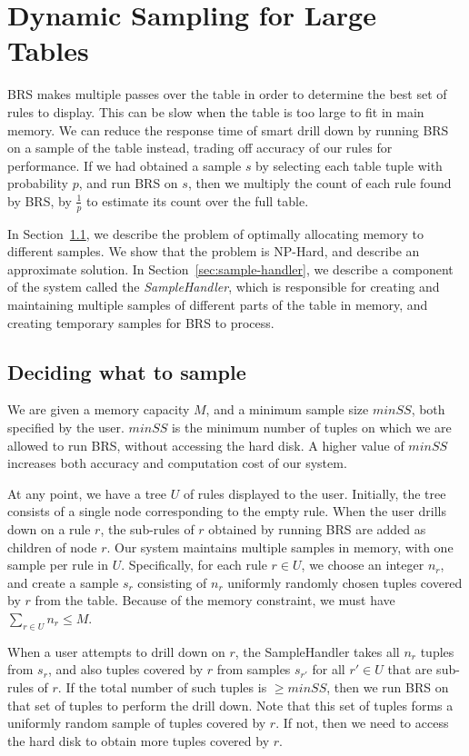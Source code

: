 \documentclass[10pt,journal,compsoc]{IEEEtran}
\newcounter{prob}
\newcommand{\papertext}[1]{#1}
\begin{document}
\section{Dynamic Sampling for Large Tables}\label{sec:sampling}

\papertext{
BRS makes multiple passes over the table in order to determine the best set of rules to display. This can be slow when the table is too large to fit in main memory. We can reduce the response time of smart drill down by running BRS on a sample of the table instead, trading off accuracy of our rules for performance. If we had obtained a sample $s$ by selecting each table tuple with probability $p$, and run BRS on $s$, then we multiply the count of each rule found by BRS, by $\frac{1}{p}$ to estimate its count over the full table.

In Section~\ref{sec:sampling_algorithms}, we describe the problem of optimally allocating memory to different samples. We show that the problem is NP-Hard, and describe an approximate solution. In Section~\ref{sec:sample-handler}, we describe a component of the system called the {\em SampleHandler}, which is responsible for creating and maintaining multiple samples of different parts of the table in memory, and creating temporary samples for BRS to process. 

\subsection{Deciding what to sample}\label{sec:sampling_algorithms}
We are given a memory capacity $M$, and a minimum sample size $minSS$, both specified by the user. $minSS$ is the minimum number of tuples on which we are allowed to run BRS, without accessing the hard disk. A higher value of $minSS$ increases both accuracy and computation cost of our system.

At any point, we have a tree $U$ of rules displayed to the user. Initially, the tree consists of a single node corresponding to the empty rule. When the user drills down on a rule $r$, the sub-rules of $r$ obtained by running BRS are added as children of node $r$. 
Our system maintains multiple samples in memory, with one sample per rule in $U$. Specifically, for each rule $r \in U$, we choose an integer $n_r$, and create a sample $s_r$ consisting of $n_r$ uniformly randomly chosen tuples covered by $r$ from the table. Because of the memory constraint, we must have $\sum_{r\in U} n_r \leq M$. 

When a user attempts to drill down on $r$, the SampleHandler takes all $n_r$ tuples from $s_r$, and also tuples covered by $r$ from samples $s_{r'}$ for all $r' \in U$ that are sub-rules of $r$. If the total number of such tuples is $\geq minSS$, then we run BRS on that set of tuples to perform the drill down. Note that this set of tuples forms a uniformly random sample of tuples covered by $r$. If not, then we need to access the hard disk to obtain more tuples covered by $r$.

}
\end{document}

